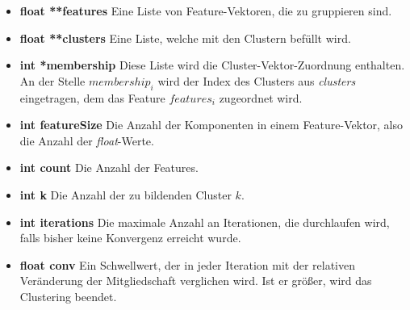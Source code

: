 \begin{itemize}
	\item \textbf{float **features} Eine Liste von Feature-Vektoren, die zu gruppieren sind.	
	\item \textbf{float **clusters} Eine Liste, welche mit den Clustern befüllt wird.
	\item \textbf{int *membership} Diese Liste wird die Cluster-Vektor-Zuordnung enthalten. An der Stelle $membership_i$  wird der Index des Clusters aus \textit{clusters} eingetragen, dem das Feature $features_i$ zugeordnet wird.
	\item \textbf{int featureSize} Die Anzahl der Komponenten in einem Feature-Vektor, also die Anzahl der \textit{float}-Werte.	
	\item \textbf{int count} Die Anzahl der Features.
	\item \textbf{int k} Die Anzahl der zu bildenden Cluster $k$.
	\item \textbf{int iterations} Die maximale Anzahl an Iterationen, die durchlaufen wird, falls bisher keine Konvergenz erreicht wurde.
	\item \textbf{float conv} Ein Schwellwert, der in jeder Iteration mit der relativen Veränderung der Mitgliedschaft verglichen wird. Ist er größer, wird das Clustering beendet.
\end{itemize}

